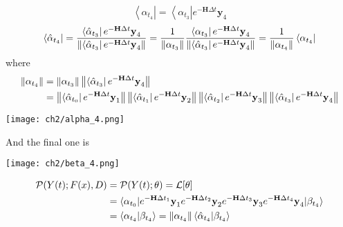 \begin{definition}
\begin{equation}
        \left< \alpha_{t_4} \right| = \left< \alpha_{t_3} \right| e^{-\textbf{H}\Delta t} \textbf{y}_4
\end{equation}
\begin{equation}
        \left< \hat{\alpha}_{t_4} \right| 
	= \frac{\left< \hat{\alpha}_{t_3} \right| e^{-\textbf{H}\Delta t} \textbf{y}_4}{\left\lVert\left< \hat{\alpha}_{t_3} \right| e^{-\textbf{H}\Delta t} \textbf{y}_4\right\rVert} 
        = \frac{1}{\left\lVert\alpha_{t_{3}}\right\rVert} \frac{\left< \alpha_{t_3} \right| e^{-\textbf{H}\Delta t} \textbf{y}_4}{\left\lVert\left< \hat{\alpha}_{t_3} \right| e^{-\textbf{H}\Delta t} \textbf{y}_4\right\rVert} 
        = \frac{1}{\left\lVert\alpha_{t_4}\right\rVert} \left< \alpha_{t_4} \right|
\end{equation}
where
\begin{align*}
        \left\lVert\alpha_{t_4}\right\rVert &= \left\lVert\alpha_{t_{3}}\right\rVert \left\lVert\left< \hat{\alpha}_{t_3} \right| e^{-\textbf{H}\Delta t} \textbf{y}_4\right\rVert\\
	&= \left\lVert\left < \hat{\alpha}_{t_{0}} \right| e^{-\textbf{H}\Delta t} \textbf{y}_1\right\rVert \left\lVert\left< \hat{\alpha}_{t_1} \right| e^{-\textbf{H}\Delta t} \textbf{y}_2\right\rVert \left\lVert\left < \hat{\alpha}_{t_{2}} \right| e^{-\textbf{H}\Delta t} \textbf{y}_3\right\rVert \left\lVert\left < \hat{\alpha}_{t_{3}} \right| e^{-\textbf{H}\Delta t} \textbf{y}_4\right\rVert
\end{align*}
\begin{center}
        \texttt{[image: ch2/alpha\_4.png]}
\end{center}
\end{definition}

\begin{definition}
And the final one is
\begin{center}
        \texttt{[image: ch2/beta\_4.png]}
\end{center}
\end{definition}

\begin{definition}
\begin{align*}
        \mathcal{P}(Y(t) ; F(x),D) &= \mathcal{P}(Y(t) ; \theta)= \mathcal{L}[\theta] \\
	&= \langle \alpha_{t_0} |e^{-\textbf{H}\Delta t_1}\textbf{y}_1e^{-\textbf{H}\Delta t_2}\textbf{y}_2 e^{-\textbf{H}\Delta t_{3}}\textbf{y}_{3} e^{-\textbf{H}\Delta t_{4}}\textbf{y}_{4} | \beta_{t_{4}} \rangle \\
	&=  \left < \alpha_{t_{4}} | \beta_{t_{4}} \right > = \left\lVert\alpha_{t_{4}}\right\rVert \left < \hat{\alpha}_{t_{4}} | \beta_{t_{4}} \right > 
\end{align*}
\end{definition}

